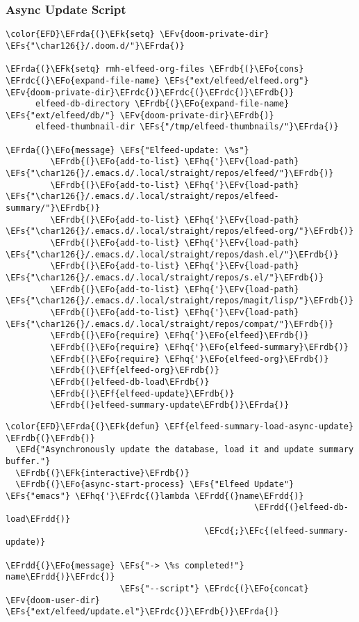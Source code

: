 \documentclass[a4wide,10pt]{article}
\newcommand{\EFc}[1]{\textcolor{EFc}{#1}} %
\newcommand{\EFcd}[1]{\textcolor{EFcd}{#1}} %
\newcommand{\EFs}[1]{\textcolor{EFs}{#1}} %
\newcommand{\EFd}[1]{\textcolor{EFd}{#1}} %
\newcommand{\EFk}[1]{\textcolor{EFk}{#1}} %
\newcommand{\EFf}[1]{\textcolor{EFf}{#1}} %
\newcommand{\EFv}[1]{\textcolor{EFv}{#1}} %
\newcommand{\EFo}[1]{\textcolor{EFo}{#1}} %
\newcommand{\EFhq}[1]{\textcolor{EFhq}{#1}} %
\newcommand{\EFrda}[1]{\textcolor{EFrda}{#1}} %
\newcommand{\EFrdb}[1]{\textcolor{EFrdb}{#1}} %
\newcommand{\EFrdc}[1]{\textcolor{EFrdc}{#1}} %
\newcommand{\EFrdd}[1]{\textcolor{EFrdd}{#1}} %
\begin{document}
\subsubsection{Async Update Script}
\label{sec:orga07d816}
\begin{Code}
\begin{Verbatim}
\color{EFD}\EFrda{(}\EFk{setq} \EFv{doom-private-dir} \EFs{"\char126{}/.doom.d/"}\EFrda{)}

\EFrda{(}\EFk{setq} rmh-elfeed-org-files \EFrdb{(}\EFo{cons} \EFrdc{(}\EFo{expand-file-name} \EFs{"ext/elfeed/elfeed.org"} \EFv{doom-private-dir}\EFrdc{)}\EFrdc{(}\EFrdc{)}\EFrdb{)}
      elfeed-db-directory \EFrdb{(}\EFo{expand-file-name} \EFs{"ext/elfeed/db/"} \EFv{doom-private-dir}\EFrdb{)}
      elfeed-thumbnail-dir \EFs{"/tmp/elfeed-thumbnails/"}\EFrda{)}

\EFrda{(}\EFo{message} \EFs{"Elfeed-update: \%s"}
         \EFrdb{(}\EFo{add-to-list} \EFhq{'}\EFv{load-path} \EFs{"\char126{}/.emacs.d/.local/straight/repos/elfeed/"}\EFrdb{)}
         \EFrdb{(}\EFo{add-to-list} \EFhq{'}\EFv{load-path} \EFs{"\char126{}/.emacs.d/.local/straight/repos/elfeed-summary/"}\EFrdb{)}
         \EFrdb{(}\EFo{add-to-list} \EFhq{'}\EFv{load-path} \EFs{"\char126{}/.emacs.d/.local/straight/repos/elfeed-org/"}\EFrdb{)}
         \EFrdb{(}\EFo{add-to-list} \EFhq{'}\EFv{load-path} \EFs{"\char126{}/.emacs.d/.local/straight/repos/dash.el/"}\EFrdb{)}
         \EFrdb{(}\EFo{add-to-list} \EFhq{'}\EFv{load-path} \EFs{"\char126{}/.emacs.d/.local/straight/repos/s.el/"}\EFrdb{)}
         \EFrdb{(}\EFo{add-to-list} \EFhq{'}\EFv{load-path} \EFs{"\char126{}/.emacs.d/.local/straight/repos/magit/lisp/"}\EFrdb{)}
         \EFrdb{(}\EFo{add-to-list} \EFhq{'}\EFv{load-path} \EFs{"\char126{}/.emacs.d/.local/straight/repos/compat/"}\EFrdb{)}
         \EFrdb{(}\EFo{require} \EFhq{'}\EFo{elfeed}\EFrdb{)}
         \EFrdb{(}\EFo{require} \EFhq{'}\EFo{elfeed-summary}\EFrdb{)}
         \EFrdb{(}\EFo{require} \EFhq{'}\EFo{elfeed-org}\EFrdb{)}
         \EFrdb{(}\EFf{elfeed-org}\EFrdb{)}
         \EFrdb{(}elfeed-db-load\EFrdb{)}
         \EFrdb{(}\EFf{elfeed-update}\EFrdb{)}
         \EFrdb{(}elfeed-summary-update\EFrdb{)}\EFrda{)}
\end{Verbatim}
\end{Code}
\begin{Code}
\begin{Verbatim}
\color{EFD}\EFrda{(}\EFk{defun} \EFf{elfeed-summary-load-async-update} \EFrdb{(}\EFrdb{)}
  \EFd{"Asynchronously update the database, load it and update summary buffer."}
  \EFrdb{(}\EFk{interactive}\EFrdb{)}
  \EFrdb{(}\EFo{async-start-process} \EFs{"Elfeed Update"} \EFs{"emacs"} \EFhq{'}\EFrdc{(}lambda \EFrdd{(}name\EFrdd{)}
                                                  \EFrdd{(}elfeed-db-load\EFrdd{)}
                                        \EFcd{;}\EFc{(elfeed-summary-update)}
                                                  \EFrdd{(}\EFo{message} \EFs{"-> \%s completed!"} name\EFrdd{)}\EFrdc{)}
                       \EFs{"--script"} \EFrdc{(}\EFo{concat} \EFv{doom-user-dir} \EFs{"ext/elfeed/update.el"}\EFrdc{)}\EFrdb{)}\EFrda{)}
\end{Verbatim}
\end{Code}
\end{document}
